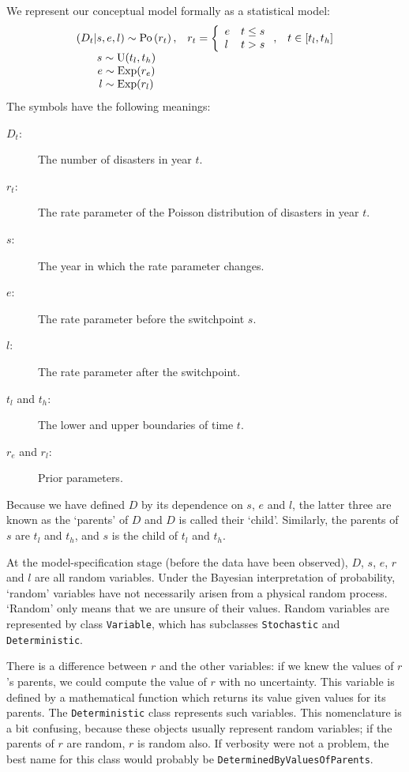 We represent our conceptual model formally as a statistical model:
\begin{equation}
    \begin{array}{ccc}
        (D_t | s, e, l) \sim \textup{Po}\left(r_t\right), & r_t=\left\{\begin{array}{ll}
            e & t\le s\\ l & t>s
            \end{array}\right.,&t\in[t_l,t_h]\\
        s\sim \textup{U}(t_l, t_h)\\
        e\sim \textup{Exp}(r_e)\\
        l\sim \textup{Exp}(r_l)        
    \end{array}
    \label{disastermodel} 
\end{equation}
The symbols have the following meanings:
\begin{description}
    \item[$D_t$:] The number of disasters in year $t$.
    \item[$r_t$:] The rate parameter of the Poisson distribution of disasters in year $t$.
    \item[$s$:] The year in which the rate parameter changes.
    \item[$e$:] The rate parameter before the switchpoint $s$.
    \item[$l$:] The rate parameter after the switchpoint.
    \item[$t_l$ and $t_h$:] The lower and upper boundaries of time $t$.
    \item[$r_e$ and $r_l$:] Prior parameters.
\end{description}
Because we have defined $D$ by its dependence on $s$, $e$ and $l$, the latter three are known as the `parents' of $D$ and $D$ is called their `child'. Similarly, the parents of $s$ are $t_l$ and $t_h$, and $s$ is the child of $t_l$ and $t_h$.

At the model-specification stage (before the data have been observed), $D$, $s$, $e$, $r$ and $l$ are all random variables. Under the Bayesian interpretation of probability, `random' variables have not necessarily arisen from a physical random process. `Random' only means that we are unsure of their values. Random variables are represented by class \texttt{Variable}, which has subclasses \texttt{Stochastic} and \texttt{Deterministic}.

There is a difference between $r$ and the other variables: if we knew the values of $r$'s parents, we could compute the value of $r$ with no uncertainty. This variable is defined by a mathematical function which returns its value given values for its parents. The \texttt{Deterministic} class represents such variables. This nomenclature is a bit confusing, because these objects usually represent random variables; if the parents of $r$ are random, $r$ is random also. If verbosity were not a problem, the best name for this class would probably be \texttt{DeterminedByValuesOfParents}.

